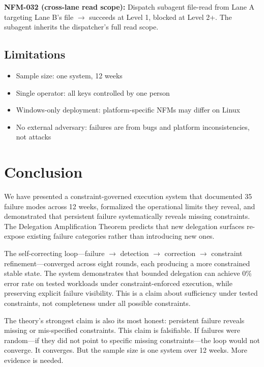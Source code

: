 \documentclass[11pt,letterpaper]{article}
\begin{document}
\textbf{NFM-032 (cross-lane read scope):} Dispatch subagent file-read from Lane A targeting Lane B's file $\rightarrow$ succeeds at Level 1, blocked at Level 2+. The subagent inherits the dispatcher's full read scope.

\subsection{Limitations}

\begin{itemize}[nosep]
  \item Sample size: one system, 12 weeks
  \item Single operator: all keys controlled by one person
  \item Windows-only deployment: platform-specific NFMs may differ on Linux
  \item No external adversary: failures are from bugs and platform inconsistencies, not attacks
\end{itemize}

\section{Conclusion}

We have presented a constraint-governed execution system that documented 35 failure modes across 12 weeks, formalized the operational limits they reveal, and demonstrated that persistent failure systematically reveals missing constraints. The Delegation Amplification Theorem predicts that new delegation surfaces re-expose existing failure categories rather than introducing new ones.

The self-correcting loop---failure $\rightarrow$ detection $\rightarrow$ correction $\rightarrow$ constraint refinement---converged across eight rounds, each producing a more constrained stable state. The system demonstrates that bounded delegation can achieve 0\% error rate on tested workloads under constraint-enforced execution, while preserving explicit failure visibility. This is a claim about sufficiency under tested constraints, not completeness under all possible constraints.

The theory's strongest claim is also its most honest: persistent failure reveals missing or mis-specified constraints. This claim is falsifiable. If failures were random---if they did not point to specific missing constraints---the loop would not converge. It converges. But the sample size is one system over 12 weeks. More evidence is needed.
\end{document}
